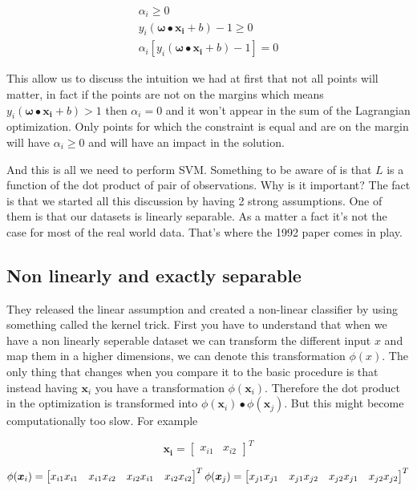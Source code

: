\documentclass[a4paper,11pt]{article}
\numberwithin{equation}{section}
\begin{document}
\begin{align*}
  \alpha_i \geq 0 \\
  y_i(\boldsymbol{\omega}\bullet{\boldsymbol{x_i}}+b)-1 \geq 0 \\
  \alpha_i[y_i(\boldsymbol{\omega}\bullet{\boldsymbol{x_i}}+b)-1] = 0
\end{align*}

This allow us to discuss the intuition we had at first that not all points will matter, in fact if the points are  not on the margins which means $y_i(\boldsymbol{\omega}\bullet{\boldsymbol{x_i}}+b) > 1 $ then $\alpha_i = 0$ and it won't appear in the sum of the Lagrangian optimization. Only points for which the constraint is equal and are on the margin will have $\alpha_i \geq 0 $ and will have an impact in the solution.

And this is all we need to perform SVM. Something to be aware of is that $L$ is a function of the dot product of pair of observations. Why is it important? The fact is that we started all this discussion by having 2 strong assumptions. One of them is that our datasets is linearly separable. As a matter a fact it's not the case for most of the real world data. That's where the 1992 paper\cite{Boser:1992:TAO:130385.130401} comes in play. 

\subsection{Non linearly and exactly separable}

They released the linear assumption and created a non-linear classifier by using something called the kernel trick. First you have to understand that when we have a non linearly seperable dataset we can transform the different input $x$ and map them in a higher dimensions, we can denote this transformation $\phi(x)$. The only thing that changes when you compare it to the basic procedure is that instead having $\boldsymbol{x}_i$ you have a transformation $\phi(\boldsymbol{x}_i)$. Therefore the dot product in the optimization is transformed into $\phi(\boldsymbol{x}_i)\bullet{\phi(\boldsymbol{x}_j)}$. But this might become computationally too slow. For example

\begin{equation*}
 \boldsymbol{x_i} =
 \begin{bmatrix}
 x_{i1} & x_{i2} 
 \end{bmatrix}^T
\end{equation*}

\begin{equation*}
 \phi(\boldsymbol{x}_i)=
 \begin{bmatrix}
    x_{i1}x_{i1}    & x_{i1}x_{i2} & x_{i2}x_{i1} & x_{i2}x_{i2}\\

 \end{bmatrix}^T \\
 \phi(\boldsymbol{x}_j)=
 \begin{bmatrix}
    x_{j1}x_{j1}    & x_{j1}x_{j2} & x_{j2}x_{j1} & x_{j2}x_{j2}\\

 \end{bmatrix}^T
\end{equation*}
\end{document}
